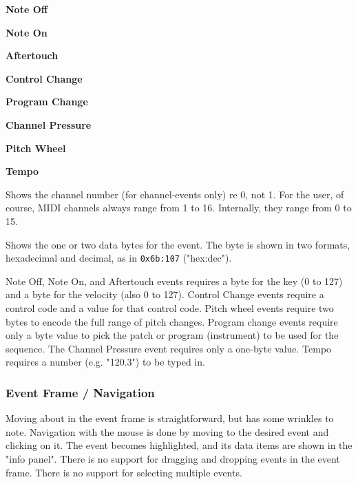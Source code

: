    \begin{enumber}
      \item \textbf{Note Off}
      \item \textbf{Note On}
      \item \textbf{Aftertouch}
      \item \textbf{Control Change}
      \item \textbf{Program Change}
      \item \textbf{Channel Pressure}
      \item \textbf{Pitch Wheel}
      \item \textbf{Tempo}
   \end{enumber}


   Shows the channel number (for channel-events only) re 0, not 1.
   For the user, of course, MIDI channels always range from
   1 to 16.  Internally, they range from 0 to 15.

   Shows the one or two data bytes for the event.
   The byte is shown in two formats, hexadecimal and decimal, as in
   \texttt{0x6b:107} ("hex:dec").

   Note Off, Note On, and Aftertouch events requires a byte for the key (0 to
   127) and a byte for the velocity (also 0 to 127).
   Control Change events require a control code and a value for that control
   code.  Pitch wheel events require two bytes to encode the full range of
   pitch changes.
   Program change events require only a byte value to pick the patch or program
   (instrument) to be used for the sequence.  The Channel Pressure event
   requires only a one-byte value.
   Tempo requires a number (e.g. "120.3") to be typed in.

\subsubsection{Event Frame / Navigation}
\label{subsec:event_frame_navigation}

   Moving about in the event frame is straightforward, but has some
   wrinkles to note.
   Navigation with the mouse is done by moving to the desired event and
   clicking on it.  The event becomes highlighted, and its data items are shown
   in the "info panel".
   There is no support for dragging and dropping events in the event frame.
   There is no support for selecting multiple events.

